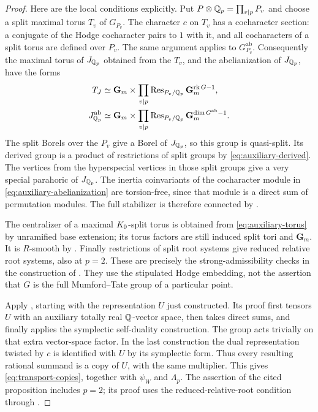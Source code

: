 \begin{proof}
Here are the local conditions explicitly.  Put $P\otimes\mathbb Q_p=
\prod_{v\mid p}P_v$ and choose a split maximal torus $T_v$ of
$G_{P_v}$.  The character $c$ on $T_v$ has a cocharacter section:
a conjugate of the Hodge cocharacter pairs to $1$ with it, and all
cocharacters of a split torus are defined over $P_v$.  The same
argument applies to $G_{P_v}^{\mathrm{ab}}$.  Consequently the
maximal torus of $J_{\mathbb Q_p}$ obtained from the $T_v$, and the
abelianization of $J_{\mathbb Q_p}$, have the forms
\begin{align}
 T_J&\simeq\mathbf G_m\times
       \prod_{v\mid p}\operatorname{Res}_{P_v/\mathbb Q_p}\mathbf G_m^{\operatorname{rk}G-1},
       \label{eq:auxiliary-torus}\\
 J_{\mathbb Q_p}^{\mathrm{ab}}&\simeq\mathbf G_m\times
       \prod_{v\mid p}\operatorname{Res}_{P_v/\mathbb Q_p}
                    \mathbf G_m^{\dim G^{\mathrm{ab}}-1}.
       \label{eq:auxiliary-abelianization}
\end{align}
The split Borels over the $P_v$ give a Borel of $J_{\mathbb Q_p}$, so this
group is quasi-split.  Its derived group is a product of restrictions
of split groups by \eqref{eq:auxiliary-derived}.  The vertices from
the hyperspecial vertices in those split groups give a very special
parahoric of $J_{\mathbb Q_p}$.  The inertia coinvariants of the cocharacter
module in \eqref{eq:auxiliary-abelianization} are torsion-free, since
that module is a direct sum of permutation modules.  The full
stabilizer is therefore connected by
\cite[Lemma~4.2.4]{KisinZhouEarlier}.

The centralizer of a maximal $K_0$-split torus is obtained from
\eqref{eq:auxiliary-torus} by unramified base extension; its torus
factors are still induced split tori and $\mathbf G_m$.
It is $R$-smooth by
\cite[Proposition~2.4.6]{KisinZhouEarlier}.  Finally restrictions of
split root systems give reduced relative root systems, also at
$p=2$.  These are precisely the strong-admissibility checks in the
construction of \cite[Proposition~5.3.8]{KisinZhou2025}.  They use
the stipulated Hodge embedding, not the assertion that $G$ is the
full Mumford--Tate group of a particular point.

Apply \cite[Proposition~2.1.9]{KisinZhou2025}, starting with the
representation $U$ just constructed.  Its proof first tensors $U$
with an auxiliary totally real $\mathbb Q$-vector space, then takes direct
sums, and finally applies the symplectic self-duality construction.
The group acts trivially on that extra vector-space factor.  In the
last construction the dual representation twisted by $c$ is
identified with $U$ by its symplectic form.  Thus every resulting
rational summand is a copy of $U$, with the same multiplier.  This
gives \eqref{eq:transport-copies}, together with $\psi_W$ and
$\Lambda_p$.  The assertion of the cited proposition includes
$p=2$; its proof uses the reduced-relative-root condition through
\cite[Lemma~2.1.8]{KisinZhou2025}.
\end{proof}

